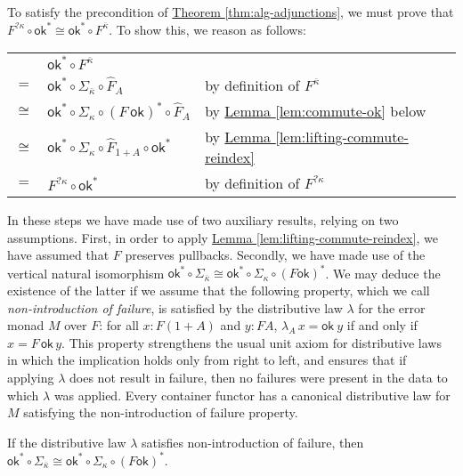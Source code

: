 \documentclass{LMCS}
\newcommand{\ok}{\mathsf{ok}}
\newcommand{\lemref}[1]{\hyperref[#1]{Lemma \ref*{#1}}}
\newcommand{\thmref}[1]{\hyperref[#1]{Theorem \ref*{#1}}}
\begin{document}
\noindent
To satisfy the precondition of \thmref{thm:alg-adjunctions}, we must
prove that $F^{?\kappa} \circ \ok^* \cong \ok^* \circ
F^{\overline{\kappa}}$. To show this, we reason as follows:
\begin{center}
  \begin{tabular}{cll}
    & $\ok^* \circ F^{\overline{\kappa}}$ & \\
    $=$     & $\ok^* \circ \Sigma_{\overline{\kappa}} \circ \hat{F}_A$ &
    by definition of $F^{\overline{\kappa}}$\\ 
    $\cong$ & $\ok^* \circ \Sigma_{\kappa} \circ (F\,\ok)^* \circ
    \hat{F}_A$ & by \lemref{lem:commute-ok} below \\ 
    $\cong$ & $\ok^* \circ \Sigma_{\kappa} \circ \hat{F}_{1+A} \circ \ok^*$ & by
    \lemref{lem:lifting-commute-reindex} \\ 
    $=$     & $F^{?\kappa} \circ \ok^*$ & by definition of $F^{?\kappa}$
  \end{tabular}
\end{center}
In these steps we have made use of two auxiliary results, relying on
two assumptions. First, in order to apply
\lemref{lem:lifting-commute-reindex}, we have assumed that $F$
preserves pullbacks. Secondly, we have made use of the vertical
natural isomorphism $\ok^* \circ \Sigma_{\overline{\kappa}} \cong
\ok^* \circ \Sigma_{\kappa} \circ (F \ok)^*$. We may deduce the
existence of the latter if we assume that the following property,
which we call \emph{non-introduction of failure}, is satisfied by the
distributive law $\lambda$ for the error monad $M$ over $F$: for all
$x : F(1 + A)$ and $y : FA$, $\lambda_A\, x = \ok\ y$ if and only if
$x = F\, \ok\, y$.  This property strengthens the usual unit axiom for
distributive laws in which the implication holds only from right to
left, and ensures that if applying $\lambda$ does not result in
failure, then no failures were present in the data to which $\lambda$
was applied. Every container functor has a canonical distributive law
for $M$ satisfying the non-introduction of failure property.

\begin{lem}\label{lem:commute-ok}
  If the distributive law $\lambda$ satisfies non-introduction of
  failure, then $\ok^* \circ \Sigma_{\overline{\kappa}} \cong \ok^*
  \circ \Sigma_{\kappa} \circ (F \ok)^*$.
\end{lem}
\end{document}

